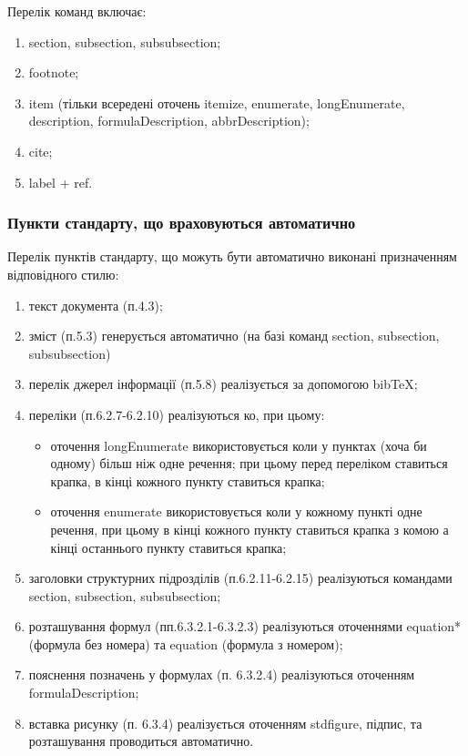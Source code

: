 Перелік команд включає:
\begin{enumerate}
  \item section, subsection, subsubsection;
  \item footnote;
  \item item (тільки всередені оточень itemize, enumerate, longEnumerate,
  description, formulaDescription, abbrDescription);
  \item cite;
  \item label + ref.
\end{enumerate}

\subsubsection{Пункти стандарту, що враховуються автоматично}\label{sec:auto}

Перелік пунктів стандарту, що можуть бути автоматично виконані призначенням відповідного стилю:
\begin{enumerate}
\item текст документа (п.4.3);
\item зміст (п.5.3) генерується автоматично (на базі команд section, subsection, subsubsection)
\item перелік джерел інформації (п.5.8) реалізується за допомогою bibTeX;
\item переліки (п.6.2.7-6.2.10) реалізуються ко, при цьому:
\begin{itemize}
  \item оточення longEnumerate використовується коли у пунктах (хоча би одному) більш ніж одне речення; при цьому перед переліком ставиться крапка, в кінці кожного пункту ставиться крапка;
  \item оточення enumerate використовується коли у кожному пункті одне речення, при цьому в кінці кожного пункту ставиться крапка з комою а кінці останнього пункту ставиться крапка;
\end{itemize}
\item заголовки структурних підрозділів (п.6.2.11-6.2.15) реалізуються командами section, subsection, subsubsection;
\item розташування формул (пп.6.3.2.1-6.3.2.3) реалізуються оточеннями equation* (формула без номера) та equation (формула з номером);
\item пояснення позначень у формулах (п. 6.3.2.4) реалізуються оточенням formulaDescription;
\item вставка рисунку (п. 6.3.4) реалізується оточенням stdfigure, підпис, та розташування проводиться автоматично.
\end{enumerate}

